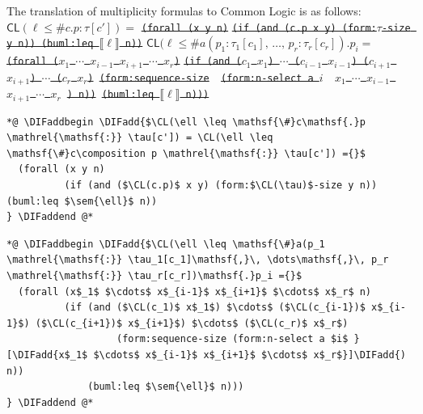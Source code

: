 \documentclass[10pt,fleqn,final]{scrreprt}
\newcommand*{\CL}{\ensuremath{\mathsf{CL}}\xspace}
\newcommand{\composition}{\raisebox{0.2pt}{\begin{sideways}\fontsize{6pt}{6pt}\selectfont$\blacklozenge$\end{sideways}}}
\newcommand{\sem}[1]{\mathopen\llbracket#1\mathclose\rrbracket}
\newcommand{\white}[1]{{\color{white}{#1}}}
\newcommand{\qqquad}{\white{x}\qquad}
\providecommand{\DIFadd}[1]{{\protect\color{blue}\uwave{#1}}} %
\providecommand{\DIFdel}[1]{{\protect\color{red}\sout{#1}}}                      %
\providecommand{\DIFaddbegin}{} %
\providecommand{\DIFaddend}{} %
\providecommand{\DIFdelbegin}{} %
\providecommand{\DIFdelend}{} %
\begin{document}
The translation of multiplicity formulas to Common Logic is as follows:
\DIFdelbegin %
\DIFdel{$\CL(\ell \leq \mathsf{\#}c\mathsf{.}p \mathrel{\mathsf{:}} \tau[c']) =$}%
\texttt{\DIFdel{(forall (x y n)}}%
\texttt{\DIFdel{(if (and (c.p x y) (form:$\tau$-size y n)) (buml:leq $\sem{\ell}$ n))}}
\DIFdel{$\CL(\ell \leq \mathsf{\#}a(p_1 \mathrel{\mathsf{:}} \tau_1[c_1]\mathsf{,}\, \dots\mathsf{,}\, p_r \mathrel{\mathsf{:}} \tau_r[c_r])\mathsf{.}p_i=$}%
\texttt{\DIFdel{(forall ($x_1$ $\cdots$ $x_{i-1}$ $x_{i+1}$ $\cdots$ $x_r$)}}%
\texttt{\DIFdel{(if (and ($c_1$ $x_1$) $\cdots$ ($c_{i-1}$ $x_{i-1}$) ($c_{i+1}$ $x_{i+1}$) $\cdots$ ($c_r$ $x_r$)}%
\DIFdel{(form:sequence-size }%
\DIFdel{(form:n-select a $i$ }%
\DIFdel{$x_1$ $\cdots$ $x_{i-1}$ $x_{i+1}$ $\cdots$ $x_r$}%
\DIFdel{) n))}%
\DIFdel{(buml:leq $\sem{\ell}$ n)))}}%
\DIFdelend 

\begin{lstlisting}[language=clif, mathescape]
*@ \DIFaddbegin \DIFadd{$\CL(\ell \leq \mathsf{\#}c\mathsf{.}p \mathrel{\mathsf{:}} \tau[c']) = \CL(\ell \leq \mathsf{\#}c\composition p \mathrel{\mathsf{:}} \tau[c']) ={}$
  (forall (x y n)
          (if (and ($\CL(c.p)$ x y) (form:$\CL(\tau)$-size y n)) (buml:leq $\sem{\ell}$ n))
} \DIFaddend @*
\end{lstlisting}

\begin{lstlisting}[language=clif, mathescape]
*@ \DIFaddbegin \DIFadd{$\CL(\ell \leq \mathsf{\#}a(p_1 \mathrel{\mathsf{:}} \tau_1[c_1]\mathsf{,}\, \dots\mathsf{,}\, p_r \mathrel{\mathsf{:}} \tau_r[c_r])\mathsf{.}p_i ={}$
  (forall (x$_1$ $\cdots$ x$_{i-1}$ x$_{i+1}$ $\cdots$ x$_r$ n)
          (if (and ($\CL(c_1)$ x$_1$) $\cdots$ ($\CL(c_{i-1})$ x$_{i-1}$) ($\CL(c_{i+1})$ x$_{i+1}$) $\cdots$ ($\CL(c_r)$ x$_r$)
                   (form:sequence-size (form:n-select a $i$ }[\DIFadd{x$_1$ $\cdots$ x$_{i-1}$ x$_{i+1}$ $\cdots$ x$_r$}]\DIFadd{) n))
              (buml:leq $\sem{\ell}$ n)))
} \DIFaddend @*
\end{lstlisting}
\end{document}
